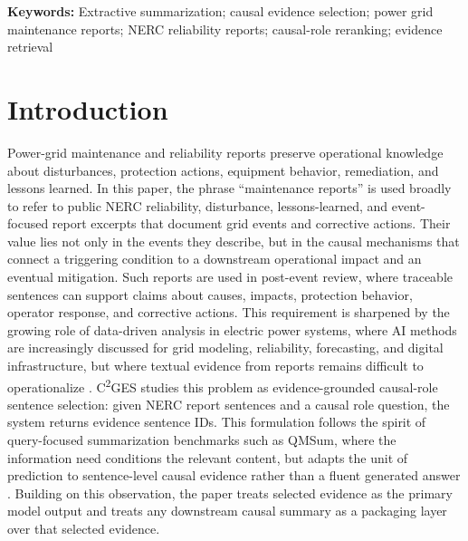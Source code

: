\documentclass{article}
\begin{document}
\textbf{Keywords:} Extractive summarization; causal evidence selection; power grid maintenance reports; NERC reliability reports; causal-role reranking; evidence retrieval

\section{Introduction}
\label{sec:introduction}

Power-grid maintenance and reliability reports preserve operational knowledge about disturbances, protection actions, equipment behavior, remediation, and lessons learned. In this paper, the phrase ``maintenance reports'' is used broadly to refer to public NERC reliability, disturbance, lessons-learned, and event-focused report excerpts that document grid events and corrective actions. Their value lies not only in the events they describe, but in the causal mechanisms that connect a triggering condition to a downstream operational impact and an eventual mitigation. Such reports are used in post-event review, where traceable sentences can support claims about causes, impacts, protection behavior, operator response, and corrective actions. This requirement is sharpened by the growing role of data-driven analysis in electric power systems, where AI methods are increasingly discussed for grid modeling, reliability, forecasting, and digital infrastructure, but where textual evidence from reports remains difficult to operationalize \cite{xie2022massively,srinivasan2023artificial,hamann2024foundation,madabhushi2023survey}. C\textsuperscript{2}GES studies this problem as evidence-grounded causal-role sentence selection: given NERC report sentences and a causal role question, the system returns evidence sentence IDs. This formulation follows the spirit of query-focused summarization benchmarks such as QMSum, where the information need conditions the relevant content, but adapts the unit of prediction to sentence-level causal evidence rather than a fluent generated answer \cite{zhong2021qmsum}. Building on this observation, the paper treats selected evidence as the primary model output and treats any downstream causal summary as a packaging layer over that selected evidence.
\end{document}
